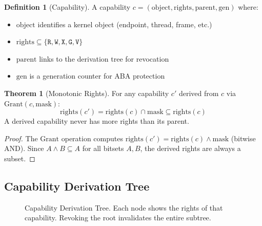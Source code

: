\documentclass[11pt,letterpaper]{article}
\theoremstyle{definition}
\newtheorem{definition}{Definition}[section]
\newtheorem{theorem}{Theorem}[section]
\begin{document}
\begin{definition}[Capability]
A capability $c = (\text{object}, \text{rights}, \text{parent}, \text{gen})$
where:
\begin{itemize}[nosep]
    \item $\text{object}$ identifies a kernel object (endpoint, thread, frame, etc.)
    \item $\text{rights} \subseteq \{\texttt{R}, \texttt{W}, \texttt{X}, \texttt{G}, \texttt{V}\}$
    \item $\text{parent}$ links to the derivation tree for revocation
    \item $\text{gen}$ is a generation counter for ABA protection
\end{itemize}
\end{definition}

\begin{theorem}[Monotonic Rights]
For any capability $c'$ derived from $c$ via $\text{Grant}(c, \text{mask})$:
\[
\text{rights}(c') = \text{rights}(c) \cap \text{mask} \subseteq \text{rights}(c)
\]
A derived capability never has more rights than its parent.
\end{theorem}

\begin{proof}
The $\text{Grant}$ operation computes $\text{rights}(c') = \text{rights}(c) \wedge \text{mask}$
(bitwise AND). Since $A \wedge B \subseteq A$ for all bitsets $A, B$, the
derived rights are always a subset.
\end{proof}

\subsection{Capability Derivation Tree}

\begin{figure}[h]
\centering
{}
\caption{Capability Derivation Tree. Each node shows the rights of that
capability. Revoking the root invalidates the entire subtree.}
\label{fig:cdt}
\end{figure}
\end{document}
